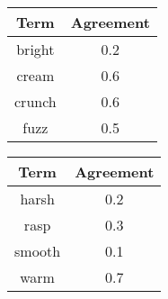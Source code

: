 \begin{tabular}{|c|c|}
	\hline
	\bf{Term} & \bf{Agreement} \tabularnewline
	\hline
	\hline
	bright & 0.2 \tabularnewline
	\hline
	cream & 0.6 \tabularnewline
	\hline
	crunch & 0.6 \tabularnewline
	\hline
	fuzz & 0.5 \tabularnewline
	\hline
\end{tabular}
\qquad
\begin{tabular}{|c|c|}
	\hline
	\bf{Term} & \bf{Agreement} \tabularnewline
	\hline
	\hline
	harsh & 0.2 \tabularnewline
	\hline
	rasp & 0.3 \tabularnewline
	\hline
	smooth & 0.1 \tabularnewline
	\hline
	warm & 0.7 \tabularnewline
	\hline
\end{tabular}
